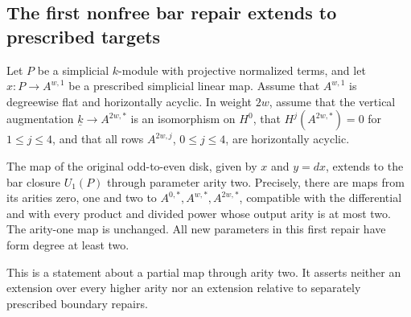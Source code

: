 \subsection{The first nonfree bar repair extends to prescribed targets}

\begin{theorem}
\label{sa08:D030}
Let \(P\) be a simplicial \(k\)-module with projective
normalized terms, and let
\(x:P\to A^{w,1}\) be a prescribed simplicial linear map.
Assume that \(A^{w,1}\) is degreewise flat and horizontally
acyclic. In weight \(2w\), assume that the vertical
augmentation \(\underline{k}\to A^{2w,*}\) is an
isomorphism on \(H^0\), that \(H^j(A^{2w,*})=0\) for
\(1\le j\le4\), and that all rows \(A^{2w,j}\),
\(0\le j\le4\), are horizontally acyclic.

The map of the original odd-to-even disk, given by
\(x\) and \(y=dx\), extends to the bar closure
\(U_1(P)\) through parameter arity two.
Precisely, there are maps from its arities zero, one
and two to \(A^{0,*},A^{w,*},A^{2w,*}\), compatible
with the differential and with every product and
divided power whose output arity is at most two.
The arity-one map is unchanged. All new parameters
in this first repair have form degree at least two.

This is a statement about a partial map through arity
two. It asserts neither an extension over every higher
arity nor an extension relative to separately prescribed
boundary repairs.
\end{theorem}

